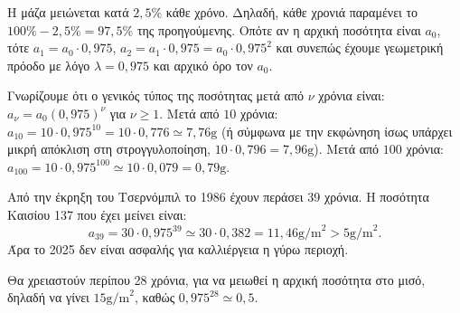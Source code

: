 
\begin{alist}
\item Η μάζα μειώνεται κατά $2,5\%$ κάθε χρόνο. Δηλαδή, κάθε χρονιά παραμένει το $100\% - 2,5\% = 97,5\%$ της προηγούμενης. Οπότε αν η αρχική ποσότητα είναι $a_0$, τότε
$a_1 = a_0 \cdot 0,975$, $a_2 = a_1 \cdot 0,975 = a_0 \cdot 0,975^2$ και συνεπώς έχουμε γεωμετρική πρόοδο με λόγο $\lambda = 0,975$ και αρχικό όρο τον $a_0$.

\item Γνωρίζουμε ότι ο γενικός τύπος της ποσότητας μετά από $\nu$ χρόνια είναι: $a_\nu = a_0 (0,975)^\nu$ για $\nu \ge 1$.
Μετά από $10$ χρόνια: $a_{10} = 10 \cdot 0,975^{10} = 10 \cdot 0,776 \simeq 7,76\text{g}$ (ή σύμφωνα με την εκφώνηση ίσως υπάρχει μικρή απόκλιση στη στρογγυλοποίηση, $10 \cdot 0,796 = 7,96 \text{g}$).
Μετά από $100$ χρόνια: $a_{100} = 10 \cdot 0,975^{100} \simeq 10 \cdot 0,079 = 0,79\text{g}$.

\item Από την έκρηξη του Τσερνόμπιλ το 1986 έχουν περάσει 39 χρόνια. Η ποσότητα Καισίου 137 που έχει μείνει είναι:
\[a_{39} = 30 \cdot 0,975^{39} \simeq 30 \cdot 0,382 = 11,46\text{g/m}^2 > 5\text{g/m}^2.\]
Άρα το 2025 δεν είναι ασφαλής για καλλιέργεια η γύρω περιοχή.

\item Θα χρειαστούν περίπου 28 χρόνια, για να μειωθεί η αρχική ποσότητα στο μισό, δηλαδή να γίνει $15\text{g/m}^2$, καθώς $0,975^{28} \simeq 0,5$.
\end{alist}

